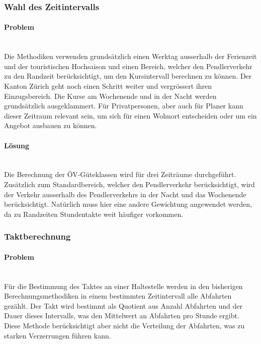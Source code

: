 \subsubsection{Wahl des Zeitintervalls}
\label{Verbesserungsmöglichkeiten:Wahl des Zeitintervalls}

\paragraph{Problem}~\\
Die Methodiken verwenden grundsätzlich einen Werktag ausserhalb der Ferienzeit und der touristischen Hochsaison und einen Bereich, welcher den Pendlerverkehr zu den Randzeit berücksichtigt, um den Kursintervall berechnen zu können.
Der Kanton Zürich geht noch einen Schritt weiter und vergrössert ihren Einzugsbereich.
Die Kurse am Wochenende und in der Nacht werden grundsätzlich ausgeklammert.
Für Privatpersonen, aber auch für Planer kann dieser Zeitraum relevant sein, um sich für einen Wohnort entscheiden oder um ein Angebot ausbauen zu können.

\paragraph{Lösung}~\\
Die Berechnung der \acs{ÖV}-Güteklassen wird für drei Zeiträume durchgeführt.
Zusätzlich zum Standardbereich, welcher den Pendlerverkehr berücksichtigt, wird der Verkehr ausserhalb des Pendlerverkehrs in der Nacht und das Wochenende berücksichtigt.
Natürlich muss hier eine andere Gewichtung angewendet werden, da zu Randzeiten Stundentakte weit häufiger vorkommen.

\subsubsection{Taktberechnung}
\label{Verbesserungsmöglichkeiten:Taktberechnung}

\paragraph{Problem}~\\
Für die Bestimmung des Taktes an einer Haltestelle werden in den bisherigen Berechnungsmethodiken in einem bestimmten Zeitintervall alle Abfahrten gezählt. Der Takt wird bestimmt als Quotient aus Anzahl Abfahrten und der Dauer dieses Intervalls, was den Mittelwert an Abfahrten pro Stunde ergibt.
Diese Methode berücksichtigt aber nicht die Verteilung der Abfahrten, was zu starken Verzerrungen führen kann.

